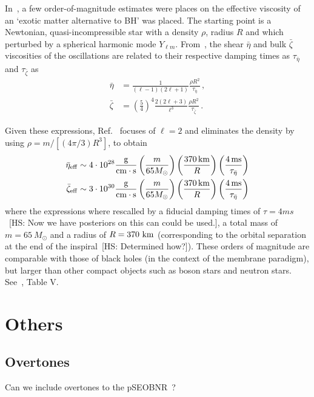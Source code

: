 \documentclass[aps,10pt,preprint,
               notitlepage,onecolumn,superscriptaddress,
               eqsecnum,
               nofootinbib,tightenlines,floatfix]{revtex4-1}
\newcommand{\hs}[1]{{\color{magenta}[HS: #1]}}
\begin{document}
In~\cite{Yunes:2016jcc}, a few order-of-magnitude estimates were places on the effective
viscosity of an `exotic matter alternative to BH' was placed.
%
The starting point is a Newtonian, quasi-incompressible star with a density $\rho$,
radius $R$ and which perturbed by a spherical harmonic mode $Y_{\ell m}$.
%
From~\cite{Cutler:1987ApJ314}, the shear $\bar{\eta}$ and bulk $\bar{\zeta}$ viscosities of the oscillations are related to their
respective damping times as $\tau_{\bar{\eta}}$ and $\tau_{\bar{\zeta}}$ as
%
\begin{align}
    \bar{\eta}  &= \frac{1}{(\ell - 1) (2\ell + 1)} \frac{\rho R^2}{\tau_{\bar{\eta}}}\,,
    \\
    \bar{\zeta} &= \left(\frac{5}{4}\right)^{4} \frac{2 (2\ell +3)}{\ell^3} \frac{\rho R^2}{\tau_{\bar{\zeta}}}\,.
\end{align}
%

Given these expressions, Ref.~\cite{Yunes:2016jcc} focuses of $\ell = 2$ and eliminates the density by using
$\rho = m / [(4 \pi / 3) R^3]$, to obtain
%
\begin{align}
    \bar{\eta}_{\rm eff} &\sim 4 \cdot 10^{28} \frac{{\rm g}}{{\rm cm} \cdot {\rm s}}
    \left( \frac{m}{65 M_{\odot}} \right)
    \left( \frac{370 \, {\rm km}}{R} \right)
    \left( \frac{4 \, {\rm ms}}{\tau_{\bar{\eta}}} \right)
    \\
    \bar{\zeta}_{\rm eff} &\sim 3 \cdot 10^{30} \frac{{\rm g}}{{\rm cm} \cdot {\rm s}}
    \left( \frac{m}{65 M_{\odot}} \right)
    \left( \frac{370 \, {\rm km}}{R} \right)
    \left( \frac{4 \, {\rm ms}}{\tau_{\bar{\eta}}} \right)
\end{align}
%
where the expressions where rescalled by a fiducial damping times of $\tau = 4 ms$~\hs{Now we have posteriors on
this can could be used.}, a total mass of $m = 65~M_{\odot}$ and a radius of $R = 370~{\rm km}$ (corresponding to
the orbital separation at the end of the inspiral~\hs{Determined how?}).
%
These orders of magnitude are comparable with those of black holes (in the context of the membrane paradigm), but
larger than other compact objects such as boson stars and neutron stars. See~\cite{Yunes:2016jcc}, Table V.

\section{Others}

\subsection{Overtones}
%
Can we include overtones to the pSEOBNR~\cite{Brito:2018rfr,Ghosh:2021mrv}?
\end{document}
